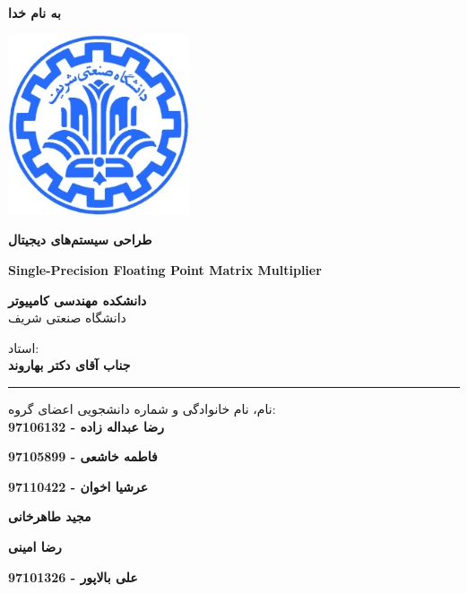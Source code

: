 \documentclass[12pt,titlepage,a4page , tikz , multi,table , svgnames,xcdraw]{article}
\begin{document}
\begin{titlepage}

 \begin{center}
        
       \vspace*{0.5cm}

 \vspace{0.5cm}
       \textbf{ \Huge{به نام خدا} }
       \vspace{0.2cm}
       
       \includegraphics[width=0.4\textwidth]{sharif1.png}
       
 	\vspace{0.3cm}
       \textbf{ \LARGE{طراحی سیستم‌های دیجیتال} }

 
   \vspace{0.3cm}
  \textbf{ \Large{ Single-Precision Floating Point Matrix Multiplier} }
   \vspace{0.3cm}
       
 
      \large \textbf{دانشکده مهندسی کامپیوتر}\\\vspace{0.2cm}
    \large   دانشگاه صنعتی شریف\\\vspace{0.25cm}
      
استاد:\\
    \textbf{{جناب آقای دکتر بهاروند}}

    \vspace{0.15cm}
    \noindent\rule[1ex]{\linewidth}{3pt}
    
    \vspace{0.5cm}
نام، نام خانوادگی و شماره دانشجویی اعضای گروه:\\

    
    \textbf{{رضا عبداله زاده - 97106132}}
        \vspace{0.05cm}
        
     
        \textbf{{فاطمه خاشعی - 97105899 }}
        \vspace{0.05cm}
        
        \textbf{{عرشیا اخوان - 97110422 }}
        \vspace{0.05cm}
        
           \textbf{{مجید طاهرخانی}}
        \vspace{0.05cm}
        
        
        \textbf{{رضا امینی}}
        \vspace{0.05cm}
        
       \textbf{{علی بالاپور - 97101326}}
        \vspace{0.05cm}


\end{center}
\end{titlepage}
\end{document}
